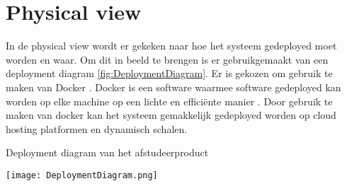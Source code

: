 \section{Physical view}
In de physical view wordt er gekeken naar hoe het systeem gedeployed moet worden en waar.
Om dit in beeld te brengen is er gebruikgemaakt van een deployment diagram \ref{fig:DeploymentDiagram}.
Er is gekozen om gebruik te maken van Docker \Parencite{Docker}.
Docker is een software waarmee software gedeployed kan worden op elke machine op een lichte en efficiënte manier \Parencite{Docker}.
Door gebruik te maken van docker kan het systeem gemakkelijk gedeployed worden op cloud hosting platformen en dynamisch schalen.

\whitespace
\begin{graphic}
    \captionsetup{type=figure}
    \caption{Deployment diagram van het afstudeerproduct}
    \texttt{[image: DeploymentDiagram.png]}
    \label{fig:DeploymentDiagram}
\end{graphic}
